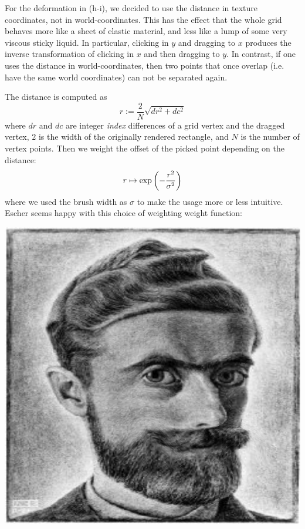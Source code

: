 \documentclass{scrartcl}
\begin{document}
For the deformation in (h-i), we decided to use the distance in texture coordinates,
not in world-coordinates. 
This has the effect that the whole grid behaves more like a sheet of elastic
material, and less like a lump of some very viscous sticky liquid. 
In particular, clicking in $y$ and
dragging to $x$ produces the inverse transformation of clicking in $x$ and then 
dragging to $y$. In contrast, if one uses the distance in world-coordinates, then two
points that once overlap (i.e. have the same world coordinates) can not be separated again.

The distance is computed as
\[
  r := \frac{2}{N} \sqrt{dr^2 + dc^2}  
\]
where $dr$ and $dc$ are integer \emph{index} differences of a grid vertex and the dragged vertex, 
$2$ is the width of the originally rendered rectangle, and $N$ is the number of vertex points.
Then we weight the offset of the picked point depending on the distance:
\[
  r \mapsto \exp\left({-\frac{r^2}{\sigma^2}}\right)
\]
where we used the brush width as $\sigma$ to make the usage more or less intuitive.
Escher seems happy with this choice of weighting weight function:

\centering\includegraphics[width=0.49\linewidth]{images/escherSmile.png}
\end{document}
